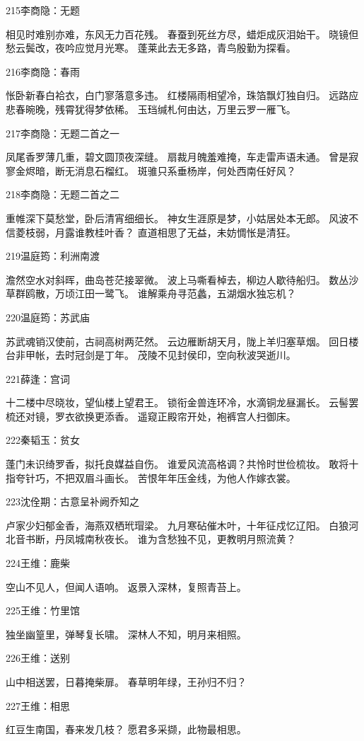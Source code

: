 215李商隐：无题

相见时难别亦难，东风无力百花残。
春蚕到死丝方尽，蜡炬成灰泪始干。
晓镜但愁云鬓改，夜吟应觉月光寒。
蓬莱此去无多路，青鸟殷勤为探看。

216李商隐：春雨

怅卧新春白袷衣，白门寥落意多违。
红楼隔雨相望冷，珠箔飘灯独自归。
远路应悲春晼晚，残霄犹得梦依稀。
玉珰缄札何由达，万里云罗一雁飞。

217李商隐：无题二首之一

凤尾香罗薄几重，碧文圆顶夜深缝。
扇裁月魄羞难掩，车走雷声语未通。
曾是寂寥金烬暗，断无消息石榴红。
斑骓只系垂杨岸，何处西南任好风？

218李商隐：无题二首之二

重帷深下莫愁堂，卧后清宵细细长。
神女生涯原是梦，小姑居处本无郎。
风波不信菱枝弱，月露谁教桂叶香？
直道相思了无益，未妨惆怅是清狂。

219温庭筠：利洲南渡

澹然空水对斜晖，曲岛苍茫接翠微。
波上马嘶看棹去，柳边人歇待船归。
数丛沙草群鸥散，万顷江田一鹭飞。
谁解乘舟寻范蠡，五湖烟水独忘机？

220温庭筠：苏武庙

苏武魂销汉使前，古祠高树两茫然。
云边雁断胡天月，陇上羊归塞草烟。
回日楼台非甲帐，去时冠剑是丁年。
茂陵不见封侯印，空向秋波哭逝川。

221薛逢：宫词

十二楼中尽晓妆，望仙楼上望君王。
锁衔金兽连环冷，水滴铜龙昼漏长。
云髻罢梳还对镜，罗衣欲换更添香。
遥窥正殿帘开处，袍裤宫人扫御床。

222秦韬玉：贫女

蓬门未识绮罗香，拟托良媒益自伤。
谁爱风流高格调？共怜时世俭梳妆。
敢将十指夸针巧，不把双眉斗画长。
苦恨年年压金线，为他人作嫁衣裳。

223沈佺期：古意呈补阙乔知之

卢家少妇郁金香，海燕双栖玳瑁梁。
九月寒砧催木叶，十年征戍忆辽阳。
白狼河北音书断，丹凤城南秋夜长。
谁为含愁独不见，更教明月照流黄？

224王维：鹿柴

空山不见人，但闻人语响。
返景入深林，复照青苔上。

225王维：竹里馆

独坐幽篁里，弹琴复长啸。
深林人不知，明月来相照。

226王维：送别

山中相送罢，日暮掩柴扉。
春草明年绿，王孙归不归？

227王维：相思

红豆生南国，春来发几枝？
愿君多采撷，此物最相思。

